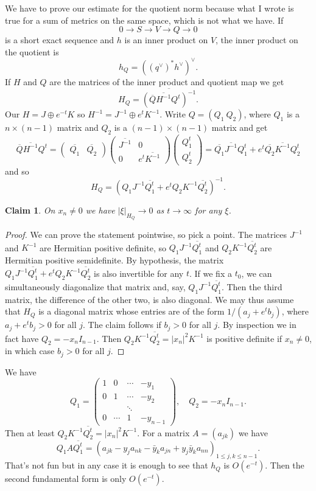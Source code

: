 \documentclass[10pt,a4paper]{amsart}
\newtheorem*{claim}{Claim}
\def\ov#1{\overline{#1}}
\begin{document}
We have to prove our estimate for the quotient norm because what I wrote is true
for a sum of metrics on the same space, which is not what we have.
If
$$
0 \to S \to V \to Q \to 0
$$
is a short exact sequence and $h$ is an inner product on $V$, the inner product
on the quotient is
$$
h_Q = ((q^\vee)^{*} h^\vee)^\vee.
$$
If $H$ and $Q$ are the matrices of the inner product and quotient map we get
$$
H_Q = \ov{(\ov Q \ov{H^{-1}} Q^t)^{-1}}.
$$
Our $H = J \oplus e^{-t} K$ so $H^{-1} = J^{-1} \oplus e^{t} K^{-1}$.
Write $Q = ( Q_1 \ Q_2)$, where $Q_1$ is a $n \times (n - 1)$ matrix and $Q_2$ is
a $(n-1) \times (n-1)$ matrix and get
$$
\ov{Q} \ov{H^{-1}} Q^t
=
\begin{pmatrix}
\ov{Q_1} & \ov{Q_2}
\end{pmatrix}
\begin{pmatrix}
\ov{J^{-1}} & 0
\\
0 & e^{t} \ov{K^{-1}}
\end{pmatrix}
\begin{pmatrix}
Q_1^t \\ Q_2^t
\end{pmatrix}
=
\ov{Q_1} \ov{J^{-1}} Q_1^t
+ e^{t} \ov{Q_2} \ov{K^{-1}} Q_2^t
$$
and so
$$
H_Q
=
(Q_1 J^{-1} \ov{Q_1^t}
+ e^{t} Q_2 K^{-1} \ov{Q_2^t})^{-1}.
$$

\begin{claim}
On $x_n \not= 0$ we have $|\xi|_{H_Q} \to 0$ as $t \to \infty$ for any $\xi$.
\end{claim}

\begin{proof}
We can prove the statement pointwise, so pick a point.
The matrices $J^{-1}$ and $K^{-1}$ are Hermitian positive definite, so
$Q_1J^{-1} \ov{Q_1^t}$ and $Q_2 K^{-1} \ov{Q_2^t}$ are Hermitian positive
semidefinite.
By hypothesis, the matrix $Q_1J^{-1} \ov{Q_1^t} + e^{t} Q_2 K^{-1} \ov{Q_2^t}$ is
also invertible for any $t$.
If we fix a $t_0$, we can simultaneously diagonalize that matrix and, say,
$Q_1J^{-1} \ov{Q_1^t}$. Then the third matrix, the difference of the other two,
is also diagonal.
We may thus assume that $H_Q$ is a diagonal matrix whose entries are of the form
$1/(a_j + e^t b_j)$, where $a_j + e^t b_j > 0$ for all $j$.
The claim follows if $b_j > 0$ for all $j$.
By inspection we in fact have $Q_2 = -x_n I_{n-1}$.
Then $Q_2 K^{-1} \ov{Q_2^t} = |x_n|^2 K^{-1}$ is positive definite if $x_n
\not= 0$, in which case $b_j > 0$ for all $j$.
\end{proof}

We have
$$
Q_1 =
\begin{pmatrix}
1 & 0 & \cdots & -y_1
\\
0 & 1 & \cdots & -y_2
\\
  & & \ddots &
\\
0 & \cdots & 1 & -y_{n-1}
\end{pmatrix},
\quad
Q_2 = -x_n I_{n-1}.
$$
Then at least $Q_2 K^{-1} \ov{Q_2^t} = |x_n|^2 K^{-1}$.
For a matrix $A = (a_{jk})$ we have
$$
Q_1 A \ov{Q_1^t}
= (a_{jk} - y_j a_{nk} - \bar y_k a_{jn} + y_j \bar y_k a_{nn})_{1 \leq j,k \leq n-1}.
$$
That's not fun but in any case it is enough to see that $h_Q$ is $O(e^{-t})$.
Then the second fundamental form is only $O(e^{-t})$.
\end{document}
